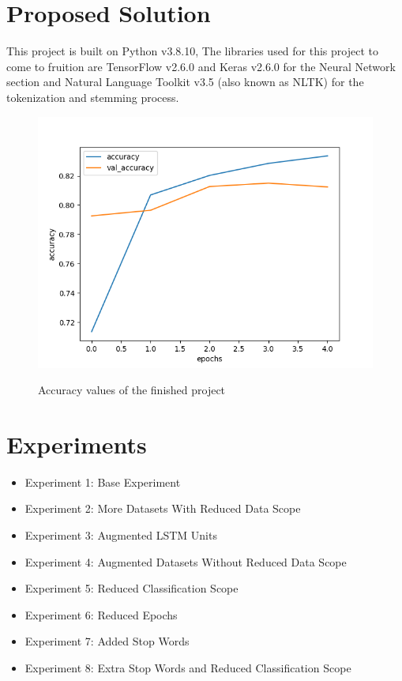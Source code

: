\documentclass[a4]{sciposter}
\begin{document}
\begin{multicols}{3}
\section{Proposed Solution}
This project is built on Python v3.8.10, The libraries used for this project to come to fruition are TensorFlow v2.6.0 and Keras v2.6.0 for the Neural Network section and Natural Language Toolkit v3.5 (also known as NLTK) for the tokenization and stemming process.
\begin{figure}[!h]
	\centering
	\includegraphics[scale=1]{Accuracy_Exp9}
	\label{fig:AccExp9}
	\captionsetup{type=figure}
	\setcounter{figure}{1}
	\caption{Accuracy values of the finished project}
\end{figure}


\section{Experiments}
\begin{itemize}
\item Experiment 1: Base Experiment
\item Experiment 2: More Datasets With Reduced Data Scope
\item Experiment 3: Augmented LSTM Units
\item Experiment 4: Augmented Datasets Without Reduced Data Scope
\item Experiment 5: Reduced Classification Scope
\item Experiment 6: Reduced Epochs
\item Experiment 7: Added Stop Words
\item Experiment 8: Extra Stop Words and Reduced Classification Scope
\end{itemize}


\end{multicols}
\end{document}
